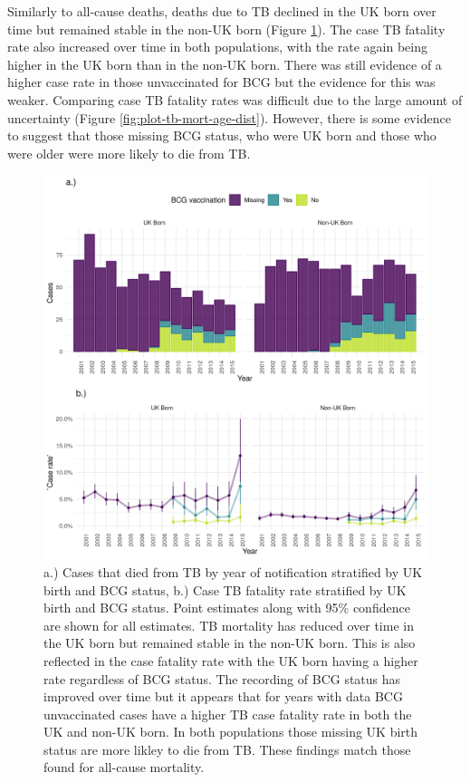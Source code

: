 \documentclass[11pt,twoside]{bristolthesis}
\begin{document}
  Similarly to all-cause deaths, deaths due to TB declined in the UK born over time but remained stable in the non-UK born (Figure \ref{fig:plot-tb-mort-case-rate}). The case TB fatality rate also increased over time in both populations, with the rate again being higher in the UK born than in the non-UK born. There was still evidence of a higher case rate in those unvaccinated for BCG but the evidence for this was weaker. Comparing case TB fatality rates was difficult due to the large amount of uncertainty (Figure \ref{fig:plot-tb-mort-age-dist}). However, there is some evidence to suggest that those missing BCG status, who were UK born and those who were older were more likely to die from TB.
  \begin{figure}
  
  {\centering \includegraphics[width=0.8\linewidth,]{chapters/tb-epi-england/figures/plot-tb-mort-case-rate} 
  
  }
  
  \caption[a.) Cases that died from TB by year of notification stratified by UK birth and BCG status, b.) Case TB fatality rate stratified by UK birth and BCG status.]{a.) Cases that died from TB by year of notification stratified by UK birth and BCG status, b.) Case TB fatality rate stratified by UK birth and BCG status. Point estimates along with 95\% confidence are shown for all estimates. TB mortality has reduced over time in the UK born but remained stable in the non-UK born. This is also reflected in the case fatality rate with the UK born having a higher rate regardless of BCG status. The recording of BCG status has improved over time but it appears that for years with data BCG unvaccinated cases have a higher TB case fatality rate in both the UK and non-UK born. In both populations those missing UK birth status are more likley to die from TB. These findings match those found for all-cause mortality.}\label{fig:plot-tb-mort-case-rate}
  \end{figure}
\end{document}

